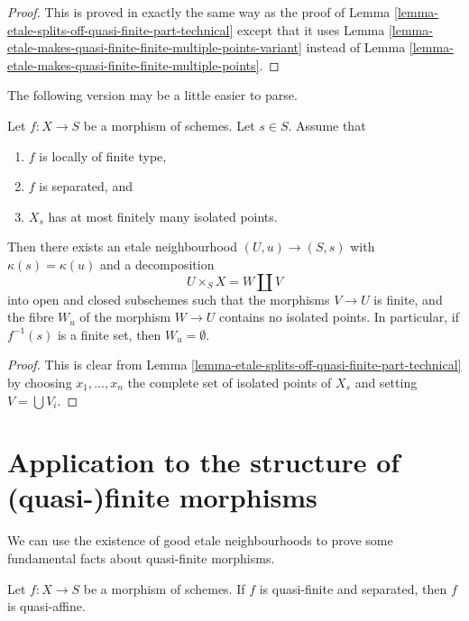 \begin{proof}
This is proved in exactly the same way as the proof of
Lemma \ref{lemma-etale-splits-off-quasi-finite-part-technical} except that it
uses Lemma \ref{lemma-etale-makes-quasi-finite-finite-multiple-points-variant}
instead of Lemma \ref{lemma-etale-makes-quasi-finite-finite-multiple-points}.
\end{proof}

\noindent
The following version may be a little easier to parse.

\begin{lemma}
\label{lemma-etale-splits-off-quasi-finite-part}
Let $f : X \to S$ be a morphism of schemes.
Let $s \in S$. Assume that
\begin{enumerate}
\item $f$ is locally of finite type,
\item $f$ is separated, and
\item $X_s$ has at most finitely many isolated points.
\end{enumerate}
Then there exists an etale neighbourhood $(U, u) \to (S, s)$
with $\kappa(s) = \kappa(u)$ and a decomposition
$$
U \times_S X = W \coprod V
$$
into open and closed subschemes such that the morphisms
$V \to U$ is finite, and the fibre $W_u$ of the
morphism $W \to U$ contains no isolated points.
In particular, if $f^{-1}(s)$ is a finite set, then $W_u = \emptyset$.
\end{lemma}

\begin{proof}
This is clear from
Lemma \ref{lemma-etale-splits-off-quasi-finite-part-technical}
by choosing $x_1, \ldots, x_n$ the complete set of
isolated points of $X_s$ and setting $V = \bigcup V_i$.
\end{proof}







\section{Application to the structure of (quasi-)finite morphisms}
\label{section-application-etale-neighbourhoods}

\noindent
We can use the existence of good etale neighbourhoods to prove
some fundamental facts about quasi-finite morphisms.

\begin{lemma}
\label{lemma-quasi-finite-separated-quasi-affine}
Let $f : X \to S$ be a morphism of schemes.
If $f$ is quasi-finite and separated, then $f$ is
quasi-affine.
\end{lemma}

